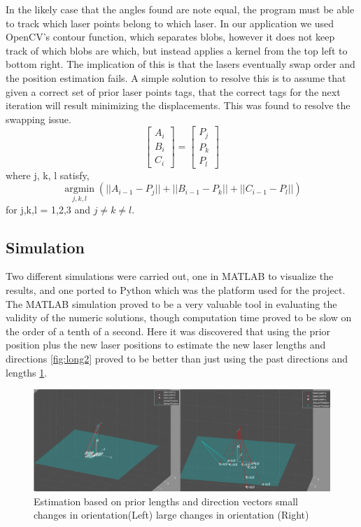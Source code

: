 \documentclass[a4paper]{article}
\begin{document}
In the likely case that the angles found are note equal, the program must be able to track which laser points belong to which laser. In our application we used OpenCV’s contour function, which separates blobs, however it does not keep track of which blobs are which, but instead applies a kernel from the top left to bottom right. The implication of this is that the lasers eventually swap order and the position estimation fails. 
A simple solution to resolve this is to assume that given a correct set of prior laser points tags, that the correct tags for the next iteration will result minimizing the displacements. This was found to resolve the swapping issue. 
\begin{equation}
\begin{bmatrix}
A_i \\ B_i \\ C_i
\end{bmatrix} =  \begin{bmatrix}
P_j\\
P_k\\
P_l
\end{bmatrix}
\end{equation}
where j, k, l satisfy,
\begin{equation}
\underset{j,k,l}{\operatorname{argmin}} (||A_{i-1} -P_j|| + ||B_{i-1} -P_k|| + ||C_{i-1} -P_l||) 
\end{equation}
for j,k,l = 1,2,3 and $j \neq k \neq l$.

\subsection{Simulation}
Two different simulations were carried out, one in MATLAB to visualize the results, and one ported to Python which was the platform used for the project. The MATLAB simulation proved to be a very valuable tool in evaluating the validity of the numeric solutions, though computation time proved to be slow on the order of a tenth of a second. Here it was discovered that using the prior position plus the new laser positions to estimate the new laser lengths and directions \ref{fig:long2} proved to be better than just using the past directions and lengths \ref{fig:long1}. 

\begin{figure}
	\includegraphics[width=\textwidth]{resection_fig6}
	\caption{Estimation based on prior lengths and direction vectors  small changes in orientation(Left) large changes in orientation (Right) }
	\label{fig:long1}
\end{figure}
\end{document}
